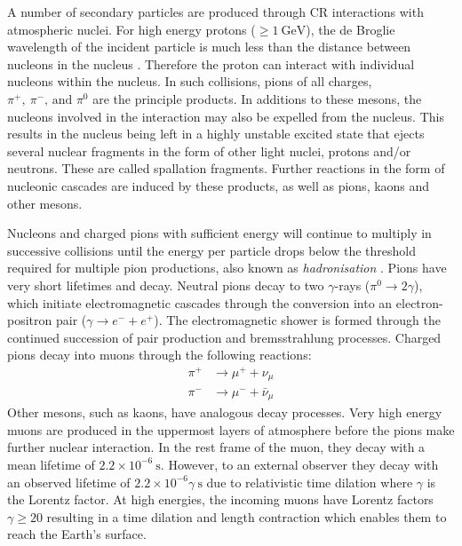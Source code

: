 A number of secondary particles are produced through CR interactions with atmospheric nuclei. For high energy protons ($\geq 1~\text{GeV}$), the de Broglie wavelength of the incident particle is much less than the distance between nucleons in the nucleus \cite{Longair_2011}. Therefore the proton can interact with individual nucleons within the nucleus. In such collisions, pions of all charges, $\pi^+,\:\pi^-\text{, and }\pi^0$ are the principle products. In additions to these mesons, the nucleons involved in the interaction may also be expelled from the nucleus. This results in the nucleus being left in a highly unstable excited state that ejects several nuclear fragments in the form of other light nuclei, protons and/or neutrons. These are called spallation fragments. Further reactions in the form of nucleonic cascades are induced by these products, as well as pions, kaons and other mesons.

Nucleons and charged pions with sufficient energy will continue to multiply in successive collisions until the energy per particle drops below the threshold required for multiple pion productions, also known as \textit{hadronisation} \cite{Longair_2011}. Pions have very short lifetimes and decay. Neutral pions decay to two $\gamma$-rays ($\pi^0\rightarrow2\gamma$), which initiate electromagnetic cascades through the conversion into an electron-positron pair ($\gamma\rightarrow e^-+e^+$). The electromagnetic shower is formed through the continued succession of pair production and bremsstrahlung processes. Charged pions decay into muons through the following reactions:
\begin{equation}
\begin{split}
    \pi^+&\rightarrow\mu^++\nu_\mu \\
    \pi^-&\rightarrow\mu^-+\bar\nu_\mu
\end{split}
\end{equation}
Other mesons, such as kaons, have analogous decay processes. Very high energy muons are produced in the uppermost layers of atmosphere before the pions make further nuclear interaction. 
In the rest frame of the muon, they decay with a mean lifetime of $2.2\times10^{-6}~\text{s}$. However, to an external observer they decay with an observed lifetime of $2.2\times10^{-6}\gamma~\text{s}$ due to relativistic time dilation where $\gamma$ is the Lorentz factor. At high energies, the incoming muons have Lorentz factors $\gamma\geq20$ resulting in a time dilation and length contraction which enables them to reach the Earth's surface. 


